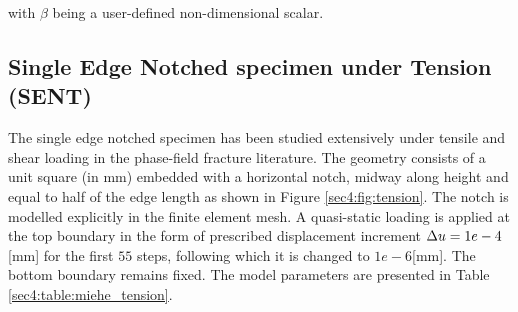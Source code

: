 \documentclass[11pt]{article}
\begin{document}
with $\beta$ being a user-defined non-dimensional scalar.

\subsection{Single Edge Notched specimen under Tension (SENT)}\label{sec4:SENtension}

The single edge notched specimen \cite{Miehe2010} has been studied extensively under tensile and shear loading in the phase-field fracture literature. The geometry consists of a unit square (in mm) embedded with a horizontal notch, midway along height and equal to half of the edge length as shown in Figure \ref{sec4:fig:tension}. The notch is modelled explicitly in the finite element mesh. A quasi-static loading is applied at the top boundary in the form of prescribed displacement increment $\Delta\hbox{$u$} = 1e-4$[mm] for the first $55$ steps, following which it is changed to $1e-6$[mm]. The bottom boundary remains fixed. The model parameters are presented in Table \ref{sec4:table:miehe_tension}.
\end{document}
